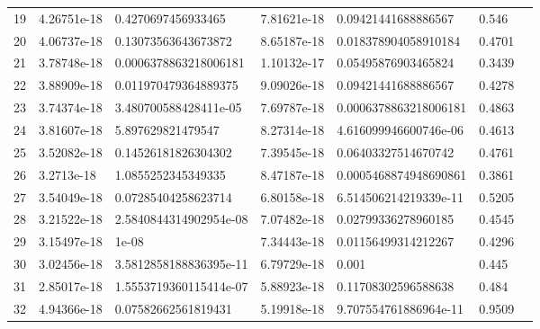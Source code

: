 \begin{tabular}{rllrllr}
19 & 4.26751e-18 & 0.4270697456933465 & 7.81621e-18 & 0.09421441688886567 & 0.546\\
20 & 4.06737e-18 & 0.13073563643673872 & 8.65187e-18 & 0.018378904058910184 & 0.4701\\
21 & 3.78748e-18 & 0.0006378863218006181 & 1.10132e-17 & 0.05495876903465824 & 0.3439\\
22 & 3.88909e-18 & 0.011970479364889375 & 9.09026e-18 & 0.09421441688886567 & 0.4278\\
23 & 3.74374e-18 & 3.480700588428411e-05 & 7.69787e-18 & 0.0006378863218006181 & 0.4863\\
24 & 3.81607e-18 & 5.897629821479547 & 8.27314e-18 & 4.616099946600746e-06 & 0.4613\\
25 & 3.52082e-18 & 0.14526181826304302 & 7.39545e-18 & 0.06403327514670742 & 0.4761\\
26 & 3.2713e-18 & 1.0855252345349335 & 8.47187e-18 & 0.0005468874948690861 & 0.3861\\
27 & 3.54049e-18 & 0.07285404258623714 & 6.80158e-18 & 6.514506214219339e-11 & 0.5205\\
28 & 3.21522e-18 & 2.5840844314902954e-08 & 7.07482e-18 & 0.02799336278960185 & 0.4545\\
29 & 3.15497e-18 & 1e-08 & 7.34443e-18 & 0.01156499314212267 & 0.4296\\
30 & 3.02456e-18 & 3.5812858188836395e-11 & 6.79729e-18 & 0.001 & 0.445\\
31 & 2.85017e-18 & 1.5553719360115414e-07 & 5.88923e-18 & 0.11708302596588638 & 0.484\\
32 & 4.94366e-18 & 0.07582662561819431 & 5.19918e-18 & 9.707554761886964e-11 & 0.9509\\
\bottomrule
\end{tabular}
